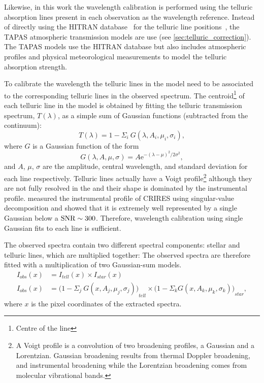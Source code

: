 Likewise, in this work the wavelength calibration is performed using the telluric absorption lines present in each observation as the wavelength reference.
Instead of directly using the {HITRAN} database~\citep{rothman_hitran2012_2013} for the telluric line positions~\citet[such as in][]{brogi_signature_2012,brogi_carbon_2014,dekok_detection_2013}, the {TAPAS} atmospheric transmission models are use (see \cref{sec:telluric_correction}).
The {TAPAS} models use the {HITRAN} database but also includes atmospheric profiles and physical meteorological measurements to model the telluric absorption strength.

To calibrate the wavelength the telluric lines in the model need to be associated to the corresponding telluric lines in the observed spectrum.
The centroid\footnote{Centre of the line} of each telluric line in the model is obtained by fitting the telluric transmission spectrum, \(T(\lambda)\), as a simple sum of Gaussian functions (subtracted from the continuum):
\begin{equation}
T(\lambda) = 1 - {\Sigma}_{i}\ G(\lambda, A_{i}, {\mu}_{i}, {\sigma}_{i}),
\end{equation}
where \(G\) is a Gaussian function of the form
\begin{equation}
G(\lambda, A, \mu, \sigma) = {A \textrm{e}}^{{-(\lambda-\mu)}^{2}/2\sigma^{2}},
\end{equation}
and \(A\), \(\mu\), \(\sigma\) are the amplitude, central wavelength, and standard deviation for each line respectively.
Telluric lines actually have a Voigt profile\footnote{A Voigt profile is a convolution of two broadening profiles, a Gaussian and a Lorentzian.
Gaussian broadening results from thermal Doppler broadening, and instrumental broadening while the Lorentzian broadening comes from molecular vibrational bands\citep{meier_art_2005}.} although they are not fully resolved in the \nir{} and their shape is dominated by the instrumental profile.
\citet{seifahrt_synthesising_2010} measured the instrumental profile of {CRIRES} using singular-value decomposition and showed that it is extremely well represented by a single Gaussian below a $\textrm{SNR}{}\sim300$.
Therefore, wavelength calibration using single Gaussian fits to each line is sufficient.

The observed spectra contain two different spectral components: stellar and telluric lines, which are multiplied together: The observed spectra are therefore fitted with a multiplication of two Gaussian-sum models.
\begin{align}
I_{obs}(x) &= {I}_{tell}(x) \times {I}_{star}(x) \nonumber \\
I_{obs}(x) &= {\Big(1 - {\Sigma}_{j}\ G(x, A_{j}, {\mu}_{j}, {\sigma}_{j})\Big)}_{tell} \times {\Big(1 - {\Sigma}_{k} G(x, A_{k}, {\mu}_{k}, {\sigma}_{k})\Big)}_{star}, \label{eqn:obs}
\end{align}
where \(x\) is the pixel coordinates of the extracted spectra.

